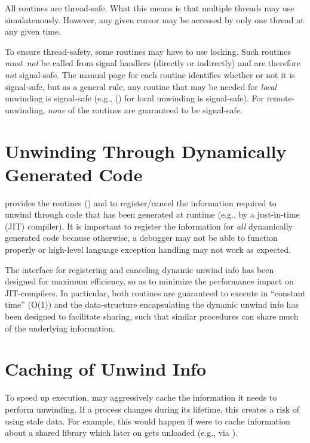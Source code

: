 \documentclass{article}
\begin{document}
All  routines are thread-safe.  What this means is
that multiple threads may use  simulatenously.
However, any given cursor may be accessed by only one thread at
any given time.

To ensure thread-safety, some  routines may have to
use locking.  Such routines \emph{must~not} be called from signal
handlers (directly or indirectly) and are therefore \emph{not}
signal-safe.  The manual page for each  routine
identifies whether or not it is signal-safe, but as a general rule,
any routine that may be needed for \emph{local} unwinding is
signal-safe (e.g., () for local unwinding is
signal-safe).  For remote-unwinding, \emph{none} of the
 routines are guaranteed to be signal-safe.


\section{Unwinding Through Dynamically Generated Code}

 provides the routines () and
 to register/cancel the information required to
unwind through code that has been generated at runtime (e.g., by a
just-in-time (JIT) compiler).  It is important to register the
information for \emph{all} dynamically generated code because
otherwise, a debugger may not be able to function properly or
high-level language exception handling may not work as expected.

The interface for registering and canceling dynamic unwind info has
been designed for maximum efficiency, so as to minimize the
performance impact on JIT-compilers.  In particular, both routines are
guaranteed to execute in ``constant time'' (O(1)) and the
data-structure encapsulating the dynamic unwind info has been designed
to facilitate sharing, such that similar procedures can share much of
the underlying information.


\section{Caching of Unwind Info}

To speed up execution,  may aggressively cache the
information it needs to perform unwinding.  If a process changes
during its lifetime, this creates a risk of  using
stale data.  For example, this would happen if  were
to cache information about a shared library which later on gets
unloaded (e.g., via ).
\end{document}
